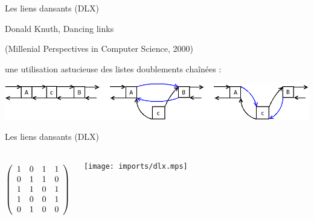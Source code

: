 \documentclass{beamer}
\let\emph\alert
\begin{document}
\begin{frame}{Les liens dansants (DLX)}

  Donald Knuth, \emph{Dancing links} \par
  {\small(Millenial Perspectives in Computer Science, 2000)}

  \bigskip\bigskip

  une utilisation astucieuse des listes doublements chaînées :

  \medskip
  \begin{center}
    \includegraphics[scale=0.35]{imports/delete.png}
  \end{center}
\end{frame}


\begin{frame}{Les liens dansants (DLX)}
 \begin{columns}
  \begin{displaymath}
   \left(\begin{array}{ c c c c c }
   1 & 0 & 1 & 1 \\
   0 & 1 & 1 & 0 \\
   1 & 1 & 0 & 1 \\
   1 & 0 & 0 & 1 \\
   0 & 1 & 0 & 0
  \end{array}\right)
  \end{displaymath}

    \texttt{[image: imports/dlx.mps]}
 \end{columns}
\end{frame}
\end{document}
